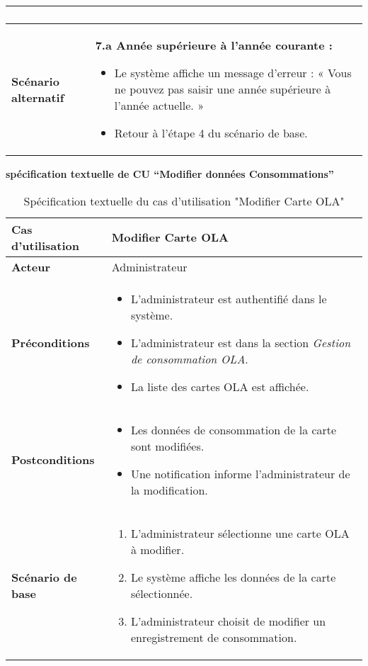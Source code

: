 \documentclass[a4paper,11pt]{report}
\begin{document}
\begin{table}[H]
\begin{tabularx}{\textwidth}{|l|X|}
\begin{enumerate}
    \end{enumerate} \\ \hline
    \textbf{Scénario alternatif} & 
    \textbf{7.a Année supérieure à l’année courante :}
\begin{itemize}
  \item Le système affiche un message d’erreur : « Vous ne pouvez pas saisir une année supérieure à l’année actuelle. »
  \item Retour à l’étape 4 du scénario de base.
\end{itemize} \\ \hline
  \end{tabularx}
\end{table}


\newpage
\textbf{spécification textuelle de CU “Modifier données Consommations”}
\begin{table}[H]
  \centering
  \renewcommand{\arraystretch}{1.5}
  \caption{Spécification textuelle du cas d'utilisation "Modifier Carte OLA"}
  \begin{tabularx}{\textwidth}{|l|X|}
    \hline
    \textbf{Cas d'utilisation} & Modifier Carte OLA \\ \hline
    \textbf{Acteur} & Administrateur \\ \hline
    \textbf{Préconditions} & 
    \begin{itemize}
      \item L’administrateur est authentifié dans le système.
      \item L'administrateur est dans la section \textit{Gestion de consommation OLA}.
      \item La liste des cartes OLA est affichée.
    \end{itemize} \\ \hline
    \textbf{Postconditions} & 
    \begin{itemize}
      \item Les données de consommation de la carte sont modifiées.
      \item Une notification informe l’administrateur de la modification.
    \end{itemize} \\ \hline
    \textbf{Scénario de base} & 
    \begin{enumerate}
      \item L’administrateur sélectionne une carte OLA à modifier.
      \item Le système affiche les données de la carte sélectionnée.
      \item L’administrateur choisit de modifier un enregistrement de consommation.

\end{enumerate}
\end{tabularx}
\end{table}
\end{document}
